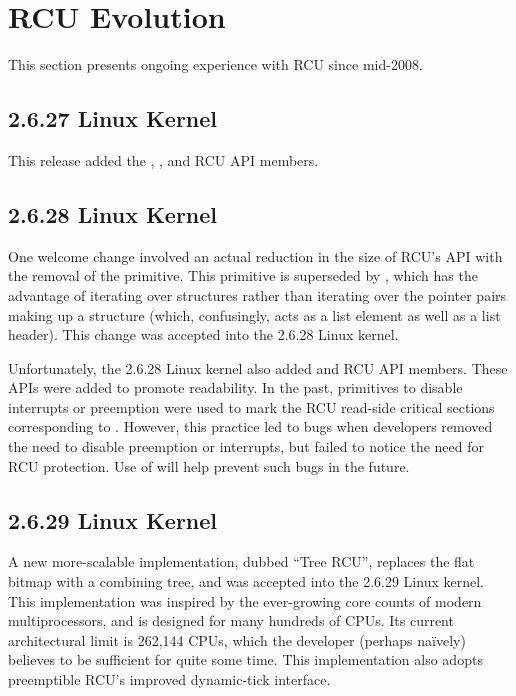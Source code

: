 \section{RCU Evolution}
\label{sec:app:rcuhist:RCU Evolution}

This section presents ongoing experience with RCU since mid-2008.

\subsection{2.6.27 Linux Kernel}

This release added the
,
, and
 RCU API members.

\subsection{2.6.28 Linux Kernel}

One welcome change involved an actual reduction in the size of RCU's
API with the removal of the  primitive.
This primitive is superseded by ,
which has the advantage of iterating over structures rather than
iterating over the pointer pairs making up a 
structure (which, confusingly, acts as a list element as well
as a list header).
This change was accepted into the 2.6.28 Linux kernel.

Unfortunately, the 2.6.28 Linux kernel also added
 and
 RCU API members.
These APIs were added to promote readability.
In the past, primitives to disable interrupts or preemption were used
to mark the RCU read-side critical sections corresponding to
.
However, this practice led to bugs when developers removed the need
to disable preemption or interrupts, but failed to notice the need
for RCU protection.
Use of  will help prevent such bugs in the
future.

\subsection{2.6.29 Linux Kernel}

A new more-scalable implementation, dubbed ``Tree RCU'', replaces
the flat bitmap with a combining tree, and was accepted into the 2.6.29
Linux kernel.
This implementation was inspired by the ever-growing core counts of
modern multiprocessors, and is designed for many hundreds of CPUs.
Its current architectural limit is 262,144 CPUs, which the developer
(perhaps na\"ively) believes to be sufficient for quite some time.
This implementation also adopts preemptible RCU's improved dynamic-tick
interface.

